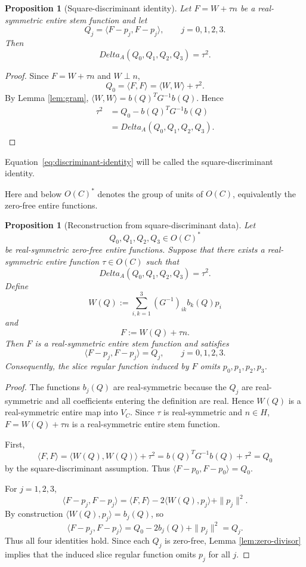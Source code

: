 \documentclass[11pt]{amsart}
\def\HH{H}%
\def\CC{C}%
\def\OO{O}%
\def\DeltaA{Delta_A}%
\numberwithin{equation}{section}
\newtheorem{proposition}[theorem]{Proposition}
\theoremstyle{definition}
\theoremstyle{remark}
\newcommand{\HH}{\mathbb H}
\newcommand{\CC}{\mathbb C}
\newcommand{\OO}{\mathcal O}
\newcommand{\DeltaA}{\Delta_A}
\begin{document}
\begin{proposition}[Square-discriminant identity]\label{prop:square-identity}
Let $F=W+\tau n$ be a real-symmetric entire stem function and let
\[
Q_j=\langle F-p_j,F-p_j\rangle,\qquad j=0,1,2,3.
\]
Then
\begin{equation}\label{eq:discriminant-identity}
\DeltaA(Q_0,Q_1,Q_2,Q_3)=\tau^2.
\end{equation}
\end{proposition}

\begin{proof}
Since $F=W+\tau n$ and $W\perp n$,
\[
Q_0=\langle F,F\rangle=\langle W,W\rangle+\tau^2.
\]
By Lemma \ref{lem:gram}, $\langle W,W\rangle=b(Q)^TG^{-1}b(Q)$. Hence
\[
\begin{aligned}
\tau^2
&=Q_0-b(Q)^TG^{-1}b(Q)\\
&=\DeltaA(Q_0,Q_1,Q_2,Q_3).
\end{aligned}
\]
\end{proof}

Equation~\eqref{eq:discriminant-identity} will be called the square-discriminant identity.

Here and below $\OO(\CC)^*$ denotes the group of units of $\OO(\CC)$, equivalently the zero-free entire functions.

\begin{proposition}[Reconstruction from square-discriminant data]\label{prop:reconstruction}
Let
\[
Q_0,Q_1,Q_2,Q_3\in\OO(\CC)^*
\]
be real-symmetric zero-free entire functions. Suppose that there exists a real-symmetric entire function $\tau\in\OO(\CC)$ such that
\[
\DeltaA(Q_0,Q_1,Q_2,Q_3)=\tau^2.
\]
Define
\[
W(Q):=\sum_{i,k=1}^3(G^{-1})_{ik}b_k(Q)p_i
\]
and
\[
F:=W(Q)+\tau n.
\]
Then $F$ is a real-symmetric entire stem function and satisfies
\[
\langle F-p_j,F-p_j\rangle=Q_j,\qquad j=0,1,2,3.
\]
Consequently, the slice regular function induced by $F$ omits $p_0,p_1,p_2,p_3$.
\end{proposition}

\begin{proof}
The functions $b_j(Q)$ are real-symmetric because the $Q_j$ are real-symmetric and all coefficients entering the definition are real. Hence $W(Q)$ is a real-symmetric entire map into $V_{\CC}$. Since $\tau$ is real-symmetric and $n\in\HH$, $F=W(Q)+\tau n$ is a real-symmetric entire stem function.

First,
\[
\langle F,F\rangle=\langle W(Q),W(Q)\rangle+\tau^2=b(Q)^TG^{-1}b(Q)+\tau^2=Q_0
\]
by the square-discriminant assumption. Thus $\langle F-p_0,F-p_0\rangle=Q_0$.

For $j=1,2,3$,
\[
\langle F-p_j,F-p_j\rangle
=\langle F,F\rangle-2\langle W(Q),p_j\rangle+\|p_j\|^2.
\]
By construction $\langle W(Q),p_j\rangle=b_j(Q)$, so
\[
\langle F-p_j,F-p_j\rangle
=Q_0-2b_j(Q)+\|p_j\|^2=Q_j.
\]
Thus all four identities hold. Since each $Q_j$ is zero-free, Lemma \ref{lem:zero-divisor} implies that the induced slice regular function omits $p_j$ for all $j$.
\end{proof}
\end{document}
